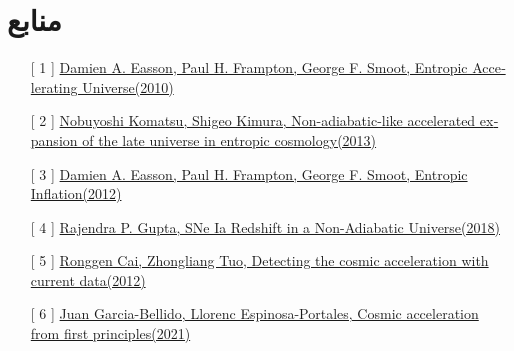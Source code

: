 \documentclass[12pt]{article}
\begin{document}
\section{منابع}
\begin{latin}
\begin{enumerate}
  \item[[ 1]] \href{https://arxiv.org/pdf/1002.4278.pdf}{Damien A. Easson, Paul H. Frampton, George F. Smoot, Entropic Accelerating Universe(2010)}
  \item[[ 2]] \href{https://arxiv.org/pdf/1208.2482.pdf}{Nobuyoshi Komatsu, Shigeo Kimura, Non-adiabatic-like accelerated expansion of the late universe in entropic cosmology(2013)}
  \item[[ 3]] \href{https://arxiv.org/pdf/1003.1528.pdf}{Damien A. Easson, Paul H. Frampton, George F. Smoot, Entropic Inflation(2012)}
  \item[[ 4]] \href{https://arxiv.org/ftp/arxiv/papers/1810/1810.12090.pdf}{Rajendra P. Gupta, SNe Ia Redshift in a Non-Adiabatic Universe(2018)}
  \item[[ 5]] \href{https://arxiv.org/pdf/1105.1603.pdf}{Ronggen Cai, Zhongliang Tuo, Detecting the cosmic acceleration with current data(2012)}
  \item[[ 6]] \href{https://arxiv.org/pdf/2106.16014.pdf}{Juan Garcia-Bellido, Llorenc Espinosa-Portales, Cosmic acceleration from first principles(2021)}
\end{enumerate}
\end{latin}
\end{document}
